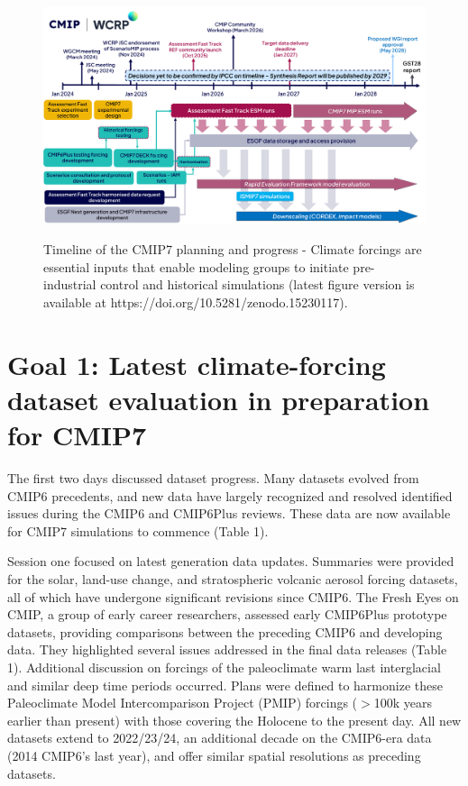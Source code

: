 \documentclass{ametsocV6.1}
\begin{document}
\begin{figure}[t]
	 \noindent\includegraphics[width=\textwidth,angle=0]{250617_Fig1.pdf}\\
	 \caption{Timeline of the CMIP7 planning and progress - Climate forcings are essential inputs that enable modeling groups to initiate pre-industrial control and historical simulations (latest figure version is available at https://doi.org/10.5281/zenodo.15230117).}
	 \label{fig:f1}
\end{figure}


\section*{Goal 1: Latest climate-forcing dataset evaluation in preparation for CMIP7}
The first two days discussed dataset progress. Many datasets evolved from CMIP6 precedents, and new data have largely recognized and resolved identified issues during the CMIP6 and CMIP6Plus reviews. These data are now available for CMIP7 simulations to commence (Table 1).

Session one focused on latest generation data updates. Summaries were provided for the solar, land-use change, and stratospheric volcanic aerosol forcing datasets, all of which have undergone significant revisions since CMIP6. The Fresh Eyes on CMIP, a group of early career researchers, assessed early CMIP6Plus prototype datasets, providing comparisons between the preceding CMIP6 and developing data. They highlighted several issues addressed in the final data releases (Table 1). Additional discussion on forcings of the paleoclimate warm last interglacial and similar deep time periods occurred. Plans were defined to harmonize these Paleoclimate Model Intercomparison Project (PMIP) forcings ($>$100k years earlier than present) with those covering the Holocene to the present day. All new datasets extend to 2022/23/24, an additional decade on the CMIP6-era data (2014 CMIP6’s last year), and offer similar spatial resolutions as preceding datasets.
\end{document}
